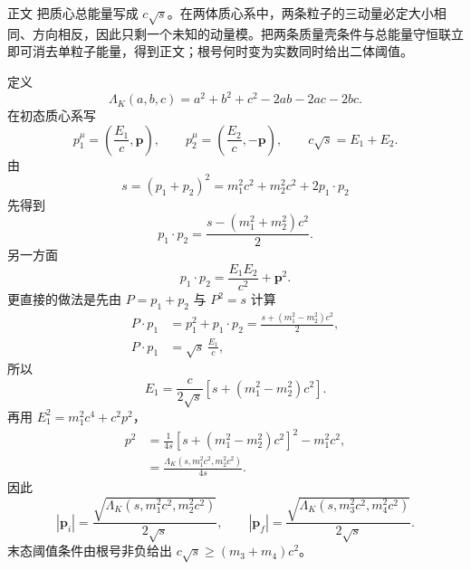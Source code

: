 \begin{derivation}
正文 把质心总能量写成 $c\sqrt s$。在两体质心系中，两条粒子的三动量必定大小相同、方向相反，因此只剩一个未知的动量模。把两条质量壳条件与总能量守恒联立即可消去单粒子能量，得到正文；根号何时变为实数同时给出二体阈值。

定义
\begin{equation*}
 \Lambda_K(a,b,c)=a^2+b^2+c^2-2ab-2ac-2bc.
 \end{equation*}
在初态质心系写
\begin{equation*}
 p_1^\mu=\left(\frac{E_1}{c},\mathbf p\right),
 \qquad
 p_2^\mu=\left(\frac{E_2}{c},-\mathbf p\right),
 \qquad
 c\sqrt s=E_1+E_2.
\end{equation*}
由
\begin{equation*}
 s=(p_1+p_2)^2=m_1^2c^2+m_2^2c^2+2p_1\!\cdot p_2
\end{equation*}
先得到
\begin{equation*}
 p_1\!\cdot p_2
 =\frac{s-(m_1^2+m_2^2)c^2}{2}.
\end{equation*}
另一方面
\begin{equation*}
 p_1\!\cdot p_2=\frac{E_1E_2}{c^2}+\mathbf p^2.
\end{equation*}
更直接的做法是先由 $P=p_1+p_2$ 与 $P^2=s$ 计算
\begin{align*}
 P\!\cdot p_1
 &=p_1^2+p_1\!\cdot p_2
 =\frac{s+(m_1^2-m_2^2)c^2}{2},\\
 P\!\cdot p_1
 &=\sqrt s\,\frac{E_1}{c},
\end{align*}
所以
\begin{equation*}
 E_1
 =\frac{c}{2\sqrt s}
 \left[s+(m_1^2-m_2^2)c^2\right].
\end{equation*}
再用 $E_1^2=m_1^2c^4+c^2p^2$，
\begin{align*}
 p^2
 &=\frac{1}{4s}
 \left[s+(m_1^2-m_2^2)c^2\right]^2-m_1^2c^2,\\
 &=\frac{\Lambda_K(s,m_1^2c^2,m_2^2c^2)}{4s}.
\end{align*}
因此
\begin{equation*}
 {
 |\mathbf p_i|
 =\frac{\sqrt{\Lambda_K(s,m_1^2c^2,m_2^2c^2)}}{2\sqrt s},
 \qquad
 |\mathbf p_f|
 =\frac{\sqrt{\Lambda_K(s,m_3^2c^2,m_4^2c^2)}}{2\sqrt s}.}
 \end{equation*}
末态阈值条件由根号非负给出 $c\sqrt s\ge(m_3+m_4)c^2$。
\end{derivation}

